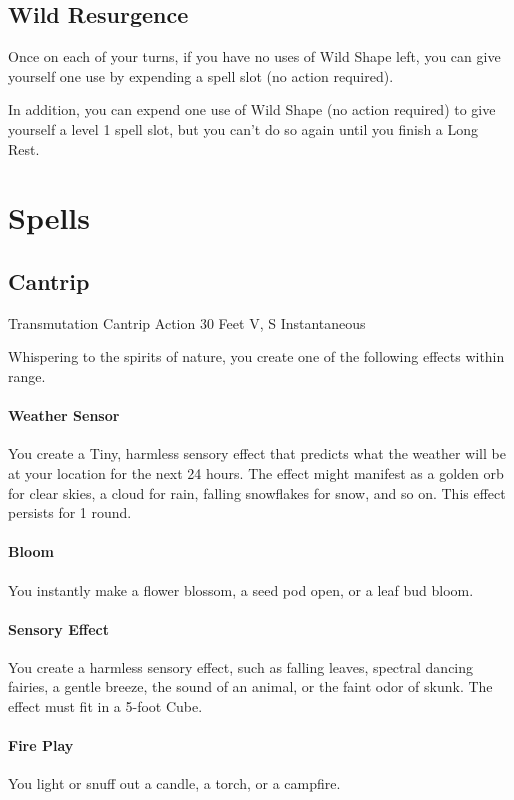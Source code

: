 \documentclass[letterpaper,openany,oneside,twocolumn]{book}
\begin{document}
\subsection*{Wild Resurgence}
Once on each of your turns, if you have no uses of Wild Shape left, you can give yourself one use by expending a spell slot (no action required).

In addition, you can expend one use of Wild Shape (no action required) to give yourself a level 1 spell slot, but you can't do so again until you finish a Long Rest.

\section*{Spells}
\subsection*{Cantrip}

	{Transmutation Cantrip}
	{Action}
	{30 Feet}
	{V, S}
	{Instantaneous}

Whispering to the spirits of nature, you create one of the following effects within range.

\paragraph*{Weather Sensor} You create a Tiny, harmless sensory effect that predicts what the weather will be at your location for the next 24 hours. The effect might manifest as a golden orb for clear skies, a cloud for rain, falling snowflakes for snow, and so on. This effect persists for 1 round.

\paragraph*{Bloom} You instantly make a flower blossom, a seed pod open, or a leaf bud bloom.

\paragraph*{Sensory Effect} You create a harmless sensory effect, such as falling leaves, spectral dancing fairies, a gentle breeze, the sound of an animal, or the faint odor of skunk. The effect must fit in a 5-foot Cube.

\paragraph*{Fire Play} You light or snuff out a candle, a torch, or a campfire.
\end{document}
